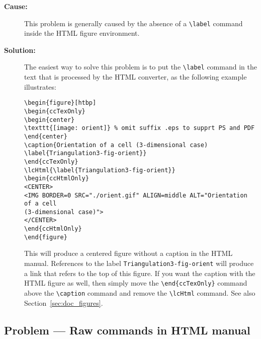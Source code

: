 
\begin{description}
\item[{\bf Cause:}] This problem is generally caused by the absence of a
     \verb|\label| command inside the HTML figure environment.

\item[{\bf Solution:}]
The easiest way to solve this problem is to put the
\verb|\label| command in the text that is processed by the HTML converter,
as the following example illustrates:

\begin{verbatim}
\begin{figure}[htbp]
\begin{ccTexOnly}
\begin{center}
\texttt{[image: orient]} % omit suffix .eps to supprt PS and PDF
\end{center}
\caption{Orientation of a cell (3-dimensional case)
\label{Triangulation3-fig-orient}}
\end{ccTexOnly}
\lcHtml{\label{Triangulation3-fig-orient}}
\begin{ccHtmlOnly}
<CENTER>
<IMG BORDER=0 SRC="./orient.gif" ALIGN=middle ALT="Orientation of a cell
(3-dimensional case)">
</CENTER>
\end{ccHtmlOnly}
\end{figure}
\end{verbatim}

This will produce a centered figure without a caption in the HTML manual.
References to the label {\tt Triangulation3-fig-orient} will produce a
link that refers to the top of this figure.  If you want the caption with
the HTML figure as well, then simply move the \verb|\end{ccTexOnly}|
command above the \verb|\caption| command and remove the \verb|\lcHtml|
command. See also Section~\ref{sec:doc_figures}.

\end{description}

\subsection*{Problem --- Raw  commands in HTML manual}

